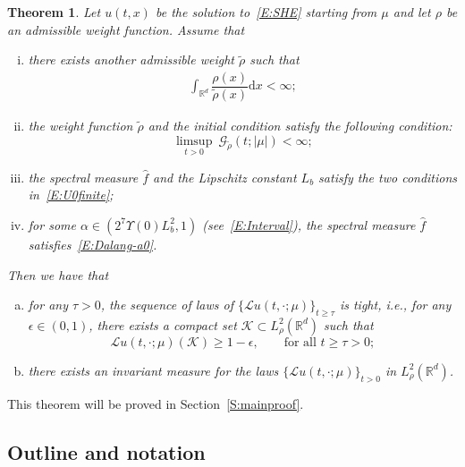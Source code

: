 \documentclass[a4paper,11pt]{article}%
\theoremstyle{plain}
\newtheorem{theorem}{Theorem}[section]
\theoremstyle{definition}
\numberwithin{equation}{section}
\newcommand{\R}{\mathbb{R}}
\newcommand{\ud}{\ensuremath{\mathrm{d}}}
\begin{document}
\begin{theorem}\label{T:Main}
  Let $u(t,x)$ be the solution to~\eqref{E:SHE} starting from $\mu$ and let $\rho$ be an admissible
  weight function. Assume that
  \begin{enumerate}[(i)]
    \item there exists another admissible weight $\tilde{\rho}$ such that
      \begin{align}\label{E:rhorho}
        \int_{\R^d}\dfrac{\rho(x)}{\tilde{\rho}(x)}\ud x < \infty;
      \end{align}
    \item the weight function $\tilde{\rho}$ and the initial condition satisfy the following
      condition:
      \begin{equation}\label{E:InitData}
        \limsup_{t>0}\: \mathcal{G}_{\tilde{\rho}}(t;|\mu|) < \infty;
      \end{equation}
    \item the spectral measure $\widehat{f}$ and the Lipschitz constant $L_b$ satisfy the two
      conditions in~\eqref{E:U0finite};
    \item for some $\alpha\in \left(2^7\Upsilon(0)L_b^2,1\right)$ (see~\eqref{E:Interval}), the
      spectral measure $\widehat{f}$ satisfies~\eqref{E:Dalang-a0}.
  \end{enumerate}
  Then we have that
  \begin{enumerate}[(a)]
    \item for any $\tau>0$, the sequence of laws of $\{\mathcal{L}u(t,\cdot;\mu)\}_{t\ge \tau}$ is
      tight, i.e., for any $\epsilon \in (0,1)$, there exists a compact set $\mathscr{K}\subset
      L^2_{\rho}(\R^d)$ such that
      \begin{equation}\label{E:cpt}
        \mathscr{L}u(t,\cdot;\mu)(\mathcal{K}) \ge 1-\epsilon,
        \qquad \text{for all $t\ge \tau>0$};
      \end{equation}
    \item there exists an invariant measure for the laws $\{\mathcal{L}u(t,\cdot;\mu)\}_{t > 0}$ in
      $L^2_\rho(\R^d)$.
  \end{enumerate}
\end{theorem}

This theorem will be proved in Section~\ref{S:mainproof}.

\subsection{Outline and notation}
\end{document}
